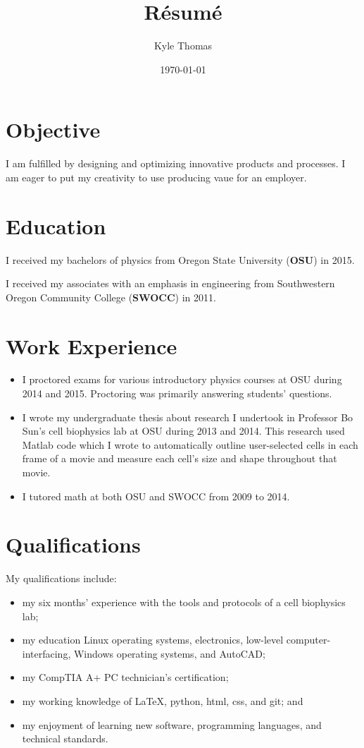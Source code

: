 \documentclass[ notitlepage, prl]{ revtex4-1}
\begin{document}
\author{Kyle Thomas}
\title{R\'esum\'e}
\date{\today}
\maketitle
\section*{Objective}
\par I am fulfilled by designing and optimizing innovative products and processes. I am eager to put my creativity to use producing vaue for an employer.
\section*{Education}
\par I received my bachelors of physics from Oregon State University (\textbf {OSU}) in 2015.
\par I received my associates with an emphasis in engineering from Southwestern Oregon Community College (\textbf {SWOCC}) in 2011.
\section*{Work Experience}
\begin{itemize}
\item I proctored exams for various introductory physics courses at OSU during 2014 and 2015. Proctoring was primarily answering students' questions.
\item I wrote my undergraduate thesis about research I undertook in Professor Bo Sun's cell biophysics lab at OSU during 2013 and 2014. 
This research used Matlab code which I wrote to automatically outline user-selected cells in each frame of a movie and measure each cell's size and shape throughout that movie.
\item I tutored math at both OSU and SWOCC from 2009 to 2014.
\end{itemize}

\section*{Qualifications}
My qualifications include:
\begin{itemize}
\item my six months' experience with the tools and protocols of a cell biophysics lab;
\item my education  Linux operating systems, electronics, low-level computer-interfacing, Windows operating systems, and AutoCAD;
\item my CompTIA A+ PC technician's certification;
\item my working knowledge of \LaTeX, python, html, css, and git; and
\item my enjoyment of learning new software, programming languages, and technical standards.
\end{itemize}
\end{document}
